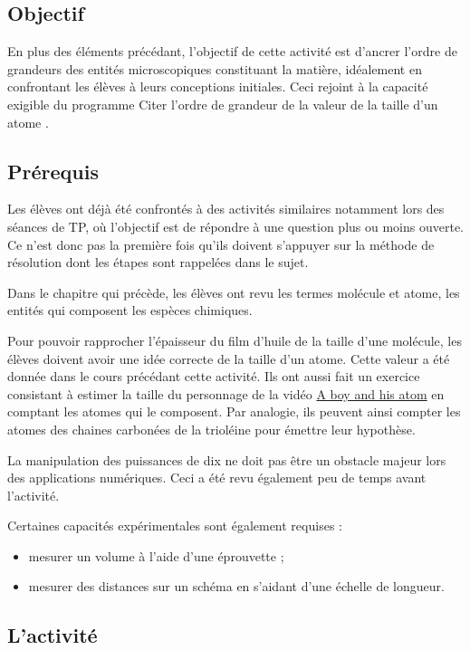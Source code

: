 \documentclass[12pt,a4paper]{article}
\begin{document}
\subsection{Objectif}

En plus des éléments précédant, l'objectif de cette activité est d'ancrer l'ordre de grandeurs des entités microscopiques constituant la matière, idéalement en confrontant les élèves à leurs conceptions initiales.
Ceci rejoint à la capacité exigible du programme \og Citer l'ordre de grandeur de la valeur de la taille d'un atome \fg{}. 

\subsection{Prérequis}

Les élèves ont déjà été confrontés à des activités similaires notamment lors des séances de TP, où l'objectif est de répondre à une question plus ou moins ouverte.
Ce n'est donc pas la première fois qu'ils doivent s'appuyer sur la méthode de résolution dont les étapes sont rappelées dans le sujet.

Dans le chapitre qui précède, les élèves ont revu les termes molécule et atome, les entités qui composent les espèces chimiques.

Pour pouvoir rapprocher l'épaisseur du film d'huile de la taille d'une molécule, les élèves doivent avoir une idée correcte de la taille d'un atome.
Cette valeur a été donnée dans le cours précédant cette activité.
Ils ont aussi fait un exercice consistant à estimer la taille du personnage de la vidéo \href{https://youtu.be/oSCX78-8-q0}{A boy and his atom} en comptant les \og atomes \fg{} qui le composent.
Par analogie, ils peuvent ainsi compter les atomes des chaines carbonées de la trioléine pour émettre leur hypothèse.

La manipulation des puissances de dix ne doit pas être un obstacle majeur lors des applications numériques.
Ceci a été revu également peu de temps avant l'activité.

Certaines capacités expérimentales sont également requises :
\begin{itemize}
\item mesurer un volume à l'aide d'une éprouvette ;
\item mesurer des distances sur un schéma en s'aidant d'une échelle de longueur.
\end{itemize}

\subsection{L'activité}
\end{document}
